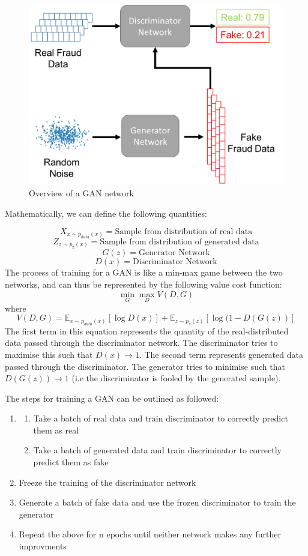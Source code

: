 \documentclass[12pt,a4paper,twoside]{report}
\begin{document}
\begin{figure}[H]

\centering
\includegraphics[width=\textwidth]{GAN-Overview}
\caption{Overview of a GAN network}
\end{figure}

Mathematically, we can define the following quantities:

$$X_{x\sim p_\text{data}(x)} = \text{Sample from distribution of real data} $$
$$Z_{z\sim p_\text{z}(x)} = \text{Sample from distribution of generated data} $$
$$G(z) = \text{Generator Network}$$
$$D(x) = \text{Discriminator Network}$$
The process of training for a GAN is like a min-max game between the two networks, and can thus be represented by the following value cost function:
$$\min _ { G } \max _ { D } V ( D ,G )$$
where 
$$V ( D ,G ) = \mathbb { E } _ { x \sim p _ { d a t a } ( x ) } [ \log D ( x ) ] + \mathbb { E } _ { z \sim p _ { z } ( z ) }[ \log ( 1- D ( G ( z ) ) ] $$
The first term in this equation represents the quantity of the real-distributed data passed through the discriminator network. The discriminator tries to maximise this such that $D(x)\rightarrow 1$. The second term represents generated data passed through the discriminator. The generator tries to minimise such that $D(G(z))\rightarrow 1$ (i.e the discriminator is fooled by the generated sample).

The steps for training a GAN can be outlined as followed:
\begin{enumerate}[Step 1:]
  \item 
  \begin{enumerate}
  \item Take a batch of real data and train discriminator to correctly predict them as real
  \item Take a batch of generated data and train discriminator to correctly predict them as fake
\end{enumerate}
  
  \item Freeze the training of the discriminator network
  \item Generate a batch of fake data and use the frozen discriminator to train the generator
  \item Repeat the above for n epochs until neither network makes any further improvments
\end{enumerate}
\end{document}
